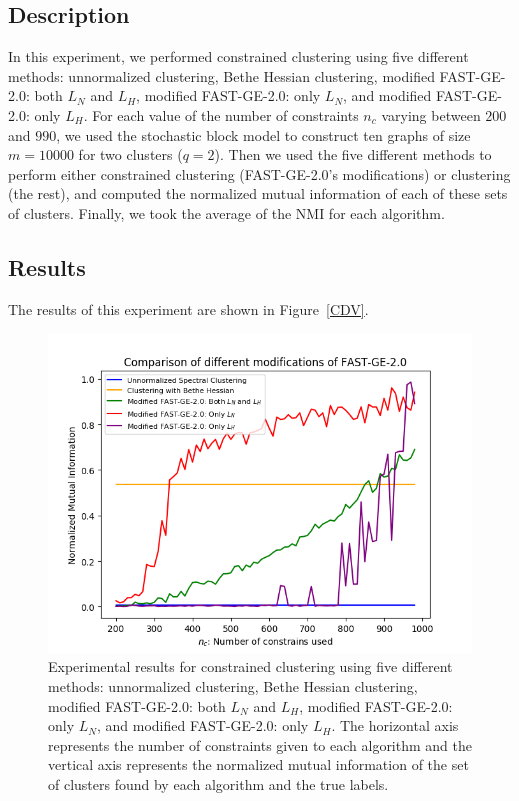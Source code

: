 \subsection*{Description}
In this experiment, we performed constrained clustering using five different methods: unnormalized clustering, Bethe Hessian clustering, modified FAST-GE-2.0: both $L_N$ and $L_H$, modified FAST-GE-2.0: only $L_N$, and modified FAST-GE-2.0: only $L_H$. 
For each value of the number of constraints $n_c$ varying between $200$ and $990$, we used the stochastic block model to construct ten graphs of size $m = 10000$ for two clusters ($q=2$). Then we used the five different methods to perform either constrained clustering (FAST-GE-2.0's modifications) or clustering (the rest), and computed the normalized mutual information of each of these sets of clusters.
Finally, we took the average of the NMI for each algorithm.

\subsection*{Results}
The results of this experiment are shown in Figure~\vref{CDV}.

\begin{figure}[h]
\begin{center}
\includegraphics[width=14cm]{figures/CDV1.png}
\end{center}
   \caption[Experimental results for constrained clustering using five different methods]{Experimental results for constrained clustering using five different methods: unnormalized clustering, Bethe Hessian clustering, modified FAST-GE-2.0: both $L_N$ and $L_H$, modified FAST-GE-2.0: only $L_N$, and modified FAST-GE-2.0: only $L_H$. The horizontal axis represents the number of constraints given to each algorithm and the vertical axis represents the normalized mutual information of the set of clusters found by each algorithm and the true labels.}
\label{CDV}
\end{figure}

